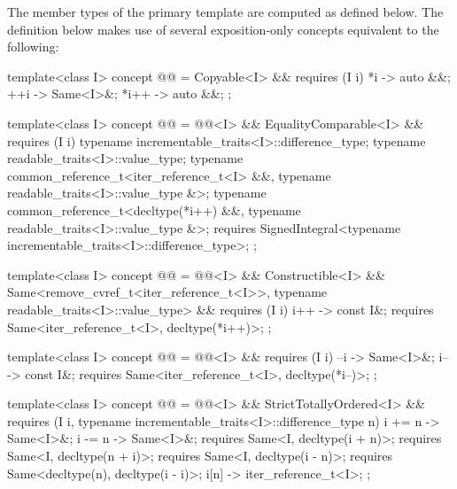 {\color{newclr}
\pnum
The member types of the primary template are computed as defined below.
The definition below makes use of several exposition-only concepts equivalent
to the following:

\begin{codeblock}
template<class I>
concept @@ =
  Copyable<I> && requires (I i) {
    { *i } -> auto &&;
    { ++i } -> Same<I>&;
    { *i++ } -> auto &&;
  };

template<class I>
concept @@ =
  @@<I> && EqualityComparable<I> && requires (I i) {
    typename incrementable_traits<I>::difference_type;
    typename readable_traits<I>::value_type;
    typename common_reference_t<iter_reference_t<I> &&,
                                typename readable_traits<I>::value_type &>;
    typename common_reference_t<decltype(*i++) &&,
                                typename readable_traits<I>::value_type &>;
    requires SignedIntegral<typename incrementable_traits<I>::difference_type>;
  };

template<class I>
concept @@ =
  @@<I> && Constructible<I> &&
  Same<remove_cvref_t<iter_reference_t<I>>, typename readable_traits<I>::value_type> &&
  requires (I i) {
    { i++ } -> const I&;
    requires Same<iter_reference_t<I>, decltype(*i++)>;
  };

template<class I>
concept @@ =
  @@<I> && requires (I i) {
    { --i } -> Same<I>&;
    { i-- } -> const I&;
    requires Same<iter_reference_t<I>, decltype(*i--)>;
  };

template<class I>
concept @@ =
  @@<I> && StrictTotallyOrdered<I> &&
  requires (I i, typename incrementable_traits<I>::difference_type n) {
    { i += n } -> Same<I>&;
    { i -= n } -> Same<I>&;
    requires Same<I, decltype(i + n)>;
    requires Same<I, decltype(n + i)>;
    requires Same<I, decltype(i - n)>;
    requires Same<decltype(n), decltype(i - i)>;
    { i[n] } -> iter_reference_t<I>;
  };
\end{codeblock}
} %

